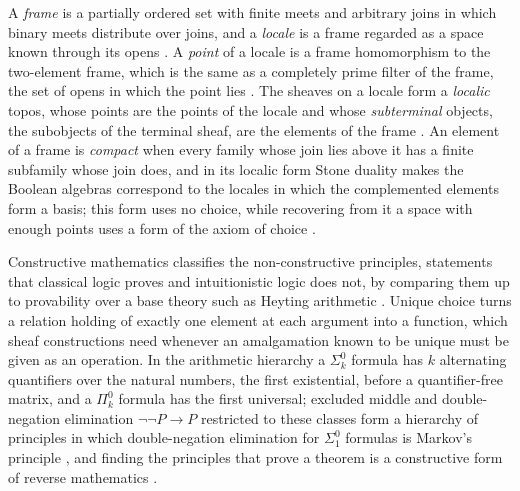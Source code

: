 \documentclass{lmcs}
\theoremstyle{definition}
\theoremstyle{remark}
\begin{document}
A \emph{frame} is a partially ordered set with finite meets and arbitrary joins in which binary meets distribute over
joins, and a \emph{locale} is a frame regarded as a space known through its opens
\cite{Caramello11}. A \emph{point} of a locale is a frame
homomorphism to the two-element frame, which is the same as a completely prime filter of the frame, the set of opens
in which the point lies \cite{Caramello11}. The
sheaves on a locale form a \emph{localic} topos, whose points are the points of the locale and whose
\emph{subterminal} objects, the subobjects of the terminal sheaf, are the elements of the
frame \cite{Caramello11}. An element of a frame is
\emph{compact} when every family whose join lies above it has a finite subfamily whose join does, and in its localic
form Stone duality makes the Boolean algebras correspond to the locales in which the complemented elements form a
basis; this form uses no choice, while recovering from it a space with enough points uses a form of the axiom of
choice \cite{Caramello11}.

Constructive mathematics classifies the non-constructive principles, statements that classical logic proves and
intuitionistic logic does not, by comparing them up to provability over a base theory such as Heyting arithmetic
\cite{ABHK04}. Unique choice turns a relation holding of exactly one element at each argument into
a function, which sheaf constructions need whenever an amalgamation known to be unique must be given as an operation.
In the arithmetic hierarchy a $\Sigma^0_k$ formula has $k$ alternating quantifiers over the natural numbers, the first
existential, before a quantifier-free matrix, and a $\Pi^0_k$ formula has the first universal; excluded middle and
double-negation elimination $\neg\neg P\to P$ restricted to these classes form a hierarchy of principles in which
double-negation elimination for $\Sigma^0_1$ formulas is Markov's principle
\cite{ABHK04}, and finding the principles that prove a theorem is a
constructive form of reverse mathematics
\cite{ABHK04}.
\end{document}
